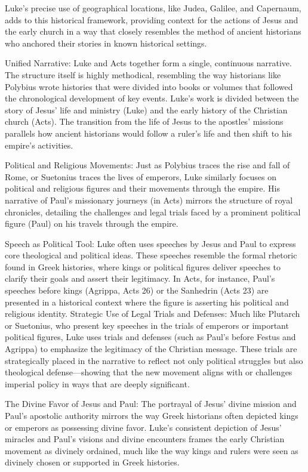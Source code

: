 Luke's precise use of geographical locations, like Judea, Galilee, and Capernaum, adds to this historical framework, providing context for the actions of Jesus and the early church in a way that closely resembles the method of ancient historians who anchored their stories in known historical settings.

Unified Narrative: Luke and Acts together form a single, continuous narrative.
The structure itself is highly methodical, resembling the way historians like Polybius wrote histories that were divided into books or volumes that followed the chronological development of key events.
Luke's work is divided between the story of Jesus' life and ministry (Luke) and the early history of the Christian church (Acts).
The transition from the life of Jesus to the apostles' missions parallels how ancient historians would follow a ruler's life and then shift to his empire's activities.

Political and Religious Movements: Just as Polybius traces the rise and fall of Rome, or Suetonius traces the lives of emperors, Luke similarly focuses on political and religious figures and their movements through the empire.
His narrative of Paul's missionary journeys (in Acts) mirrors the structure of royal chronicles, detailing the challenges and legal trials faced by a prominent political figure (Paul) on his travels through the empire.

Speech as Political Tool: Luke often uses speeches by Jesus and Paul to express core theological and political ideas.
These speeches resemble the formal rhetoric found in Greek histories, where kings or political figures deliver speeches to clarify their goals and assert their legitimacy.
In Acts, for instance, Paul's speeches before kings (Agrippa, Acts 26) or the Sanhedrin (Acts 23) are presented in a historical context where the figure is asserting his political and religious identity.
Strategic Use of Legal Trials and Defenses: Much like Plutarch or Suetonius, who present key speeches in the trials of emperors or important political figures, Luke uses trials and defenses (such as Paul's before Festus and Agrippa) to emphasize the legitimacy of the Christian message.
These trials are strategically placed in the narrative to reflect not only political struggles but also theological defense---showing that the new movement aligns with or challenges imperial policy in ways that are deeply significant.

The Divine Favor of Jesus and Paul: The portrayal of Jesus' divine mission and Paul's apostolic authority mirrors the way Greek historians often depicted kings or emperors as possessing divine favor.
Luke's consistent depiction of Jesus' miracles and Paul's visions and divine encounters frames the early Christian movement as divinely ordained, much like the way kings and rulers were seen as divinely chosen or supported in Greek histories.


